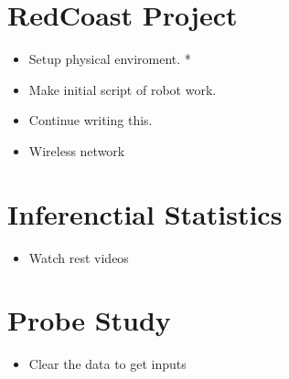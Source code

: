 \documentclass{article}
\begin{document}
 

\section{RedCoast Project}
\begin{itemize}
\item Setup physical enviroment. *
\item Make initial script of robot work.
\item Continue writing this.
\item Wireless network
\end{itemize}

\section{Inferenctial Statistics}
\begin{itemize}
\item Watch rest videos
\end{itemize}

\section{Probe Study}
\begin{itemize}
\item Clear the data to get inputs
\end{itemize}


\nocite{langley00}



\end{document}
